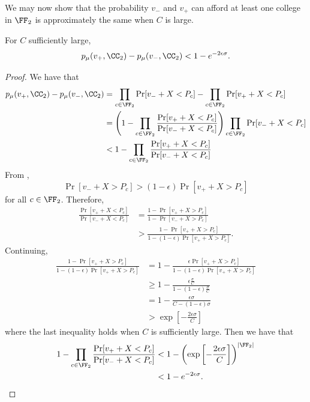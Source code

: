 \documentclass[10pt]{article}
\begin{document}
\begin{ReviewVerbatim}
We may now show that the probability $v_-$ and $v_+$ can afford at least one college in $\FF_2$ is approximately the same when $C$ is large.
\begin{proposition}\label{prop:lt-approx-F2}
For $C$ sufficiently large,
\begin{equation}
    p_\mu(v_+, \CC_2) - p_\mu(v_-, \CC_2) < 1 - e^{-2\epsilon\sigma}.
\end{equation}
\end{proposition}
\begin{proof}
We have that
\begin{align}
    p_\mu(v_+, \CC_2) - p_\mu(v_-, \CC_2)
    &= \prod_{c\in \FF_2}\Pr[v_- + X < P_c] - \prod_{c\in \FF_2}\Pr[v_+ + X < P_c]\\
    &= \left(1 - \prod_{c\in \FF_2}\frac{\Pr[v_+ + X < P_c]}{\Pr[v_- + X < P_c]}\right) \prod_{c\in \FF_2}\Pr[v_- + X < P_c]\\
    &< 1 - \prod_{c\in \FF_2}\frac{\Pr[v_+ + X < P_c]}{\Pr[v_- + X < P_c]}
\end{align}
From ,
\begin{equation}
    \Pr[v_- + X > P_c] > (1-\epsilon)\Pr[v_+ + X > P_c]
\end{equation}
for all $c\in \FF_2$. Therefore,
\begin{align}
    \frac{\Pr[v_+ + X < P_c]}{\Pr[v_- + X < P_c]} &= \frac{1 - \Pr[v_+ + X > P_c]}{1 - \Pr[v_- + X > P_c]}\\
    &> \frac{1 - \Pr[v_+ + X > P_c]}{1 - (1-\epsilon)\Pr[v_+ + X > P_c]}.
\end{align}
Continuing,
\begin{align}
    \frac{1 - \Pr[v_+ + X > P_c]}{1 - (1-\epsilon)\Pr[v_+ + X > P_c]} &= 1 - \frac{\epsilon \Pr[v_+ + X > P_c]}{1 - (1-\epsilon) \Pr[v_+ + X > P_c]}\\
    &\ge 1 - \frac{\epsilon\frac{\sigma}{C}}{1 - (1-\epsilon)\frac{\sigma}{C}}\\
    &= 1 - \frac{\epsilon\sigma}{C - (1-\epsilon)\sigma}\\
    &> \exp\left[-\frac{2\epsilon\sigma}{C}\right]
\end{align}
where the last inequality holds when $C$ is sufficiently large. Then we have that
\begin{align}
    1 - \prod_{c\in \FF_2}\frac{\Pr[v_+ + X < P_c]}{\Pr[v_- + X < P_c]}
    &< 1 - \left(\exp\left[-\frac{2\epsilon\sigma}{C}\right]\right)^{|\FF_2|}\\
    &< 1 - e^{-2\epsilon\sigma}.
\end{align}
\end{proof}
\end{ReviewVerbatim}
\end{document}
